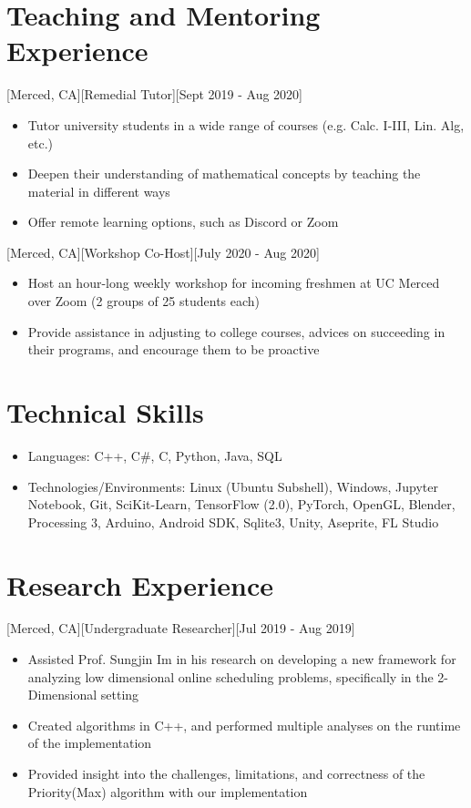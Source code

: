 \documentclass{article}
\begin{document}
\section{Teaching and Mentoring Experience }
[Merced, CA][Remedial Tutor][Sept 2019 - Aug 2020]
\begin{itemize}
  \item Tutor university students in a wide range of courses (e.g. Calc. I-III, Lin. Alg, etc.)
  \item Deepen their understanding of mathematical concepts by teaching the material in different ways
  \item Offer remote learning options, such as Discord or Zoom
\end{itemize}
[Merced, CA][Workshop Co-Host][July 2020 - Aug 2020]
\begin{itemize}
  \item Host an hour-long weekly workshop for incoming freshmen at UC Merced over Zoom (2 groups of 25 students each)
  \item Provide assistance in adjusting to college courses, advices on succeeding in their programs, and encourage them to be proactive
\end{itemize}

\section{Technical Skills}
\begin{itemize}
  \item Languages: C++, C\#, C, Python, Java, SQL
  \item Technologies/Environments: Linux (Ubuntu Subshell), Windows, Jupyter Notebook, Git, SciKit-Learn, TensorFlow (2.0), PyTorch, OpenGL, Blender, Processing 3, Arduino, Android SDK, Sqlite3, Unity, Aseprite, FL Studio
\end{itemize}

\section{Research Experience}
[Merced, CA][Undergraduate Researcher][Jul 2019 - Aug 2019]
\begin{itemize}
  \item Assisted Prof. Sungjin Im in his research on developing a new framework for analyzing low dimensional online scheduling problems, specifically in the 2-Dimensional setting
  \item Created algorithms in C++, and performed multiple analyses on the runtime of the implementation
  \item Provided insight into the challenges, limitations, and correctness of the Priority(Max) algorithm with our implementation
\end{itemize}
\end{document}
